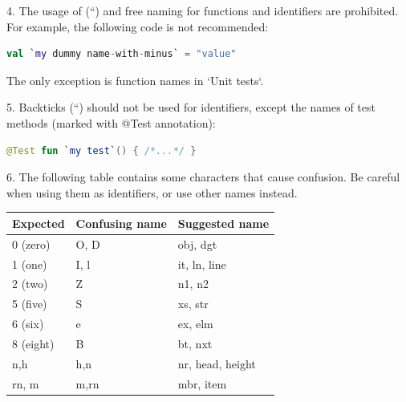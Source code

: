 4.	The usage of (``) and free naming for functions and identifiers are prohibited. For example, the following code is not recommended:



\begin{lstlisting}[language=Kotlin]
val `my dummy name-with-minus` = "value"
\end{lstlisting}


The only exception is function names in `Unit tests`.



5.	Backticks (``) should not be used for identifiers, except the names of test methods (marked with @Test annotation):

\begin{lstlisting}[language=Kotlin]
 @Test fun `my test`() { /*...*/ }
\end{lstlisting}
6.  The following table contains some characters that cause confusion. Be careful when using them as identifiers, or use other names instead.



\begin{center}

\begin{tabular}{ |p{}|p{}|p{}| }

\hline

Expected&Confusing name&Suggested name\\

\hline

 0 (zero)      & O, D                     & obj, dgt         \\

 1 (one)       & I, l                     & it, ln, line     \\

 2 (two)       & Z                        & n1, n2           \\

 5 (five)      & S                        & xs, str          \\

 6 (six)       & e                        & ex, elm          \\

 8 (eight)     & B                        & bt, nxt          \\

 n,h           & h,n                      & nr, head, height \\

 rn, m         & m,rn                     & mbr, item        \\

\hline

\end{tabular}

\end{center}

